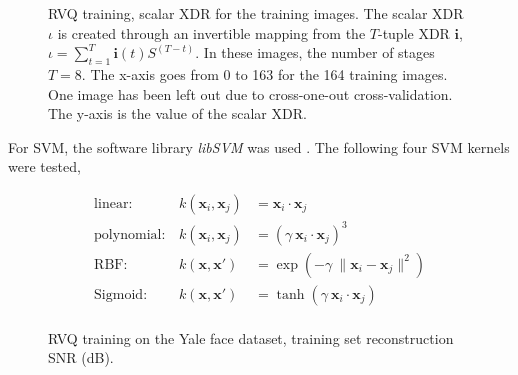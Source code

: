 \begin{Body}
											\begin{figure}[t]
											\centering
											\caption{RVQ training, scalar XDR for the training images.  The scalar XDR $\iota$ is created through an invertible mapping from the $T$-tuple XDR $\mathbf{i}$, $\iota=\sum\limits_{t=1}^{T}\mathbf{i}(t)S^{(T-t)}$.  In these images, the number of stages $T=8$.  The x-axis goes from 0 to 163 for the 164 training images.  One image has been left out due to cross-one-out cross-validation.  The y-axis is the value of the scalar XDR.}
											\label{fig:RVQ_faceRecognition_sSoC}	
											\end{figure}

For SVM, the software library \emph{libSVM} was used \cite{2011_JNL_libSVM_Chang}.  The following four SVM kernels were tested, 

\begin{equation}
\begin{array}{lllllll}
\mathrm{linear:} & k(\mathbf{x}_i, \mathbf{x}_j) &= \mathbf{x}_i \cdot \mathbf{x}_j\\ 
\mathrm{polynomial:} & k(\mathbf{x}_i, \mathbf{x}_j) &= (\gamma \ \mathbf{x}_i \cdot \mathbf{x}_j)^3\\
\mathrm{RBF:} & k(\mathbf{x}, \mathbf{x'}) &= \exp(-\gamma \ \|\mathbf{x}_i - \mathbf{x}_j\|^2)\\
\mathrm{Sigmoid:} & k(\mathbf{x}, \mathbf{x'}) &= \tanh(\gamma \ \mathbf{x}_i \cdot \mathbf{x}_j)\\
\end{array}
\end{equation}


											\begin{figure}[t]
											\centering
											\caption{RVQ training on the Yale face dataset, training set reconstruction SNR (dB).}
											\label{fig:RVQ_trg_reconstruction_SNR}	
											\end{figure}


\end{Body}
